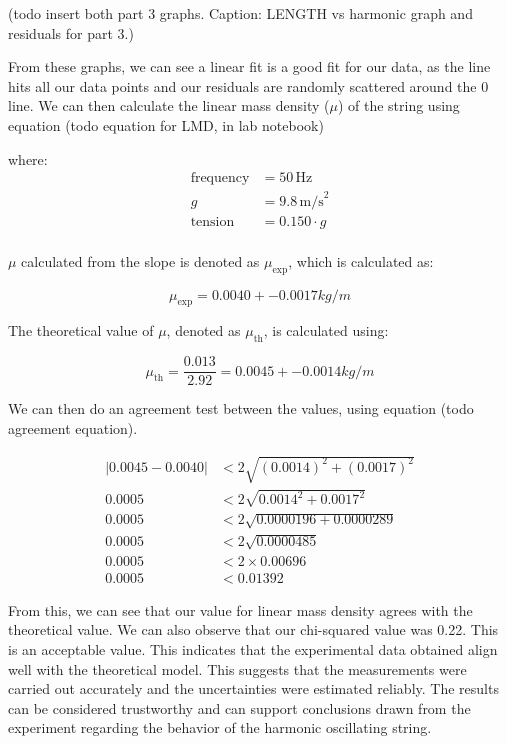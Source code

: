 \documentclass[11pt]{article}
\begin{document}
    (todo insert both part 3 graphs. Caption: LENGTH vs harmonic graph and residuals for part 3.)

    From these graphs, we can see a linear fit is a good fit for our data, as the line hits all our data points and our residuals are randomly scattered around the 0 line. We can then calculate the linear mass density ($\mu$) of the string using equation (todo equation for LMD, in lab notebook)
    
    where:
    \begin{align*}
    \text{frequency} &= 50 \, \text{Hz} \\
    g &= 9.8 \, \text{m/s}^2 \\
    \text{tension} &= 0.150 \cdot g\\
    \end{align*}
    
    $\mu$ calculated from the slope is denoted as $\mu_{\text{exp}}$, which is calculated as:
    
    \begin{equation}
    \mu_{\text{exp}} = 0.0040 +- 0.0017 kg/m
    \end{equation}
    
    The theoretical value of $\mu$, denoted as $\mu_{\text{th}}$, is calculated using:
    
    \begin{equation}
    \mu_{\text{th}} = \frac{0.013}{2.92} = 0.0045 +- 0.0014 kg/m
    \end{equation}

    We can then do an agreement test between the values, using equation (todo agreement equation).

    \begin{align*}
    |0.0045 - 0.0040| &< 2 \sqrt{(0.0014)^2 + (0.0017)^2} \\
    0.0005 &< 2 \sqrt{0.0014^2 + 0.0017^2} \\
    0.0005 &< 2 \sqrt{0.0000196 + 0.0000289} \\
    0.0005 &< 2 \sqrt{0.0000485} \\
    0.0005 &< 2 \times 0.00696 \\
    0.0005 &< 0.01392
    \end{align*}

    From this, we can see that our value for linear mass density agrees with the theoretical value. We can also observe that our chi-squared value was 0.22. This is an acceptable value. This indicates that the experimental data obtained align well with the theoretical model. This suggests that the measurements were carried out accurately and the uncertainties were estimated reliably. The results can be considered trustworthy and can support conclusions drawn from the experiment regarding the behavior of the harmonic oscillating string. 
\end{document}
